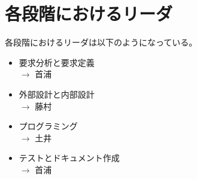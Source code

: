 \documentclass[dvipdfmx, 11pt]{jsarticle}
\begin{document}
\section{各段階におけるリーダ}
    各段階におけるリーダは以下のようになっている。
    \begin{itemize}
        \item 要求分析と要求定義 \\       
            $\rightarrow$ 首浦
        \item 外部設計と内部設計 \\
            $\rightarrow$ 藤村
        \item プログラミング \\
            $\rightarrow$ 土井
        \item テストとドキュメント作成 \\
            $\rightarrow$ 首浦
    \end{itemize}

% 
% 
\end{document}
